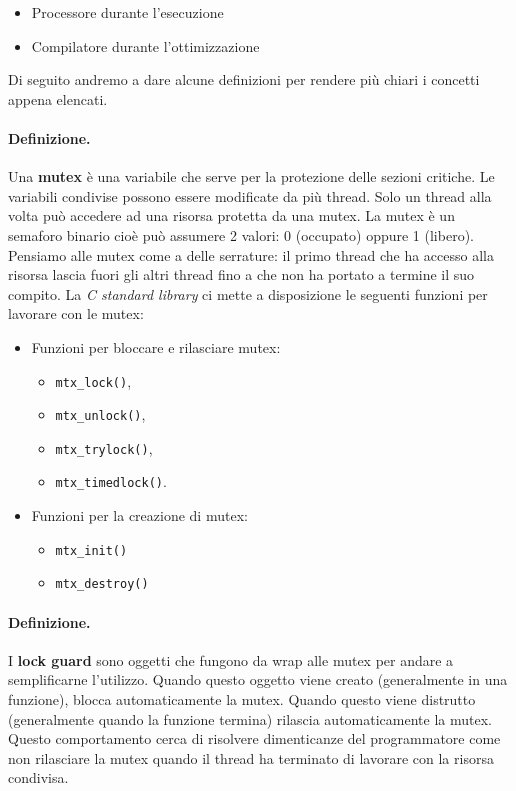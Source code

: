 \begin{itemize}
    \item Processore durante l'esecuzione
    \item Compilatore durante l'ottimizzazione
\end{itemize}

Di seguito andremo a dare alcune definizioni per rendere più chiari i concetti appena elencati.

\paragraph{Definizione.}
Una \textbf{mutex} è una variabile che serve per la protezione delle sezioni critiche.
Le variabili condivise possono essere modificate da più thread.
Solo un thread alla volta può accedere ad una risorsa protetta da una mutex.
La mutex è un semaforo binario cioè può assumere 2 valori: 0 (occupato)
oppure 1 (libero).
Pensiamo alle mutex come a delle serrature:
il primo thread che ha accesso alla risorsa lascia fuori gli altri thread
fino a che non ha portato a termine il suo compito. La \textit{C standard library}
ci mette a disposizione le seguenti funzioni per lavorare con le mutex:

\begin{itemize}
    \item Funzioni per bloccare e rilasciare mutex:
          \begin{itemize}
              \item \verb|mtx_lock()|,
              \item \verb|mtx_unlock()|,
              \item \verb|mtx_trylock()|,
              \item \verb|mtx_timedlock()|.
          \end{itemize}
    \item Funzioni per la creazione di mutex:
          \begin{itemize}
              \item \verb|mtx_init()|
              \item \verb|mtx_destroy()|
          \end{itemize}
\end{itemize}

\paragraph{Definizione.}
I \textbf{lock guard} sono oggetti che fungono da wrap alle mutex per andare a
semplificarne l'utilizzo. Quando questo oggetto viene creato (generalmente in una
funzione), blocca automaticamente la mutex. Quando questo viene distrutto (generalmente
quando la funzione termina) rilascia automaticamente la mutex. Questo comportamento
cerca di risolvere dimenticanze del programmatore come non rilasciare la mutex quando
il thread ha terminato di lavorare con la risorsa condivisa.

